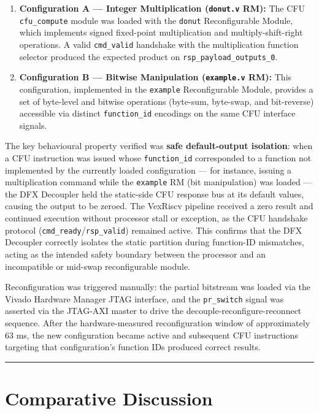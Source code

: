 \begin{enumerate}
  \item \textbf{Configuration A — Integer Multiplication (\texttt{donut.v} RM):} The CFU \texttt{cfu\_compute} module was loaded with the \texttt{donut} Reconfigurable Module, which implements signed fixed-point multiplication and multiply-shift-right operations. A valid \texttt{cmd\_valid} handshake with the multiplication function selector produced the expected product on \texttt{rsp\_payload\_outputs\_0}.
  \item \textbf{Configuration B — Bitwise Manipulation (\texttt{example.v} RM):} This configuration, implemented in the \texttt{example} Reconfigurable Module, provides a set of byte-level and bitwise operations (byte-sum, byte-swap, and bit-reverse) accessible via distinct \texttt{function\_id} encodings on the same CFU interface signals.
\end{enumerate}
The key behavioural property verified was \textbf{safe default-output isolation}: when a CFU instruction was issued whose \texttt{function\_id} corresponded to a function not implemented by the currently loaded configuration — for instance, issuing a multiplication command while the \texttt{example} RM (bit manipulation) was loaded — the DFX Decoupler held the static-side CFU response bus at its default values, causing the output to be zeroed. The VexRiscv pipeline received a zero result and continued execution without processor stall or exception, as the CFU handshake protocol (\texttt{cmd\_ready}/\texttt{rsp\_valid}) remained active. This confirms that the DFX Decoupler correctly isolates the static partition during function-ID mismatches, acting as the intended safety boundary between the processor and an incompatible or mid-swap reconfigurable module.

Reconfiguration was triggered manually: the partial bitstream was loaded via the Vivado Hardware Manager JTAG interface, and the \texttt{pr\_switch} signal was asserted via the JTAG-AXI master to drive the decouple-reconfigure-reconnect sequence. After the hardware-measured reconfiguration window of approximately 63 ms, the new configuration became active and subsequent CFU instructions targeting that configuration's function IDs produced correct results.

\vspace{0.4em}\hrule\vspace{0.4em}

\section{Comparative Discussion}

